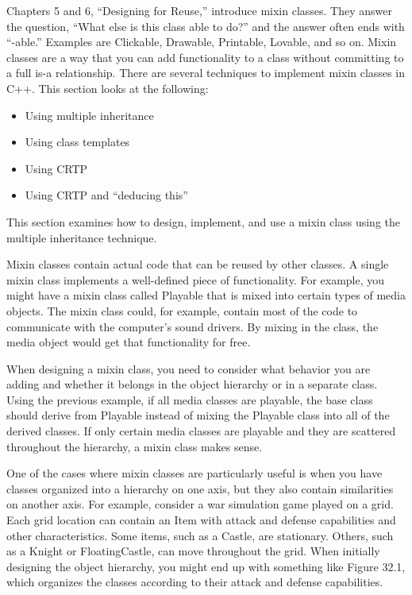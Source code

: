 
Chapters 5 and 6, “Designing for Reuse,” introduce mixin classes. They answer the question, “What else is this class able to do?” and the answer often ends with “-able.” Examples are Clickable, Drawable, Printable, Lovable, and so on. Mixin classes are a way that you can add functionality to a class without committing to a full is-a relationship. There are several techniques to implement mixin classes in C++. This section looks at the following:

\begin{itemize}
\item
Using multiple inheritance

\item
Using class templates

\item
Using CRTP

\item
Using CRTP and “deducing this”
\end{itemize}


This section examines how to design, implement, and use a mixin class using the multiple inheritance technique.


Mixin classes contain actual code that can be reused by other classes. A single mixin class implements a well-defined piece of functionality. For example, you might have a mixin class called Playable that is mixed into certain types of media objects. The mixin class could, for example, contain most of the code to communicate with the computer’s sound drivers. By mixing in the class, the media object would get that functionality for free.

When designing a mixin class, you need to consider what behavior you are adding and whether it belongs in the object hierarchy or in a separate class. Using the previous example, if all media classes are playable, the base class should derive from Playable instead of mixing the Playable class into all of the derived classes. If only certain media classes are playable and they are scattered throughout the hierarchy, a mixin class makes sense.

One of the cases where mixin classes are particularly useful is when you have classes organized into a hierarchy on one axis, but they also contain similarities on another axis. For example, consider a war simulation game played on a grid. Each grid location can contain an Item with attack and defense capabilities and other characteristics. Some items, such as a Castle, are stationary. Others, such as a Knight or FloatingCastle, can move throughout the grid. When initially designing the object hierarchy, you might end up with something like Figure 32.1, which organizes the classes according to their attack and defense capabilities.

